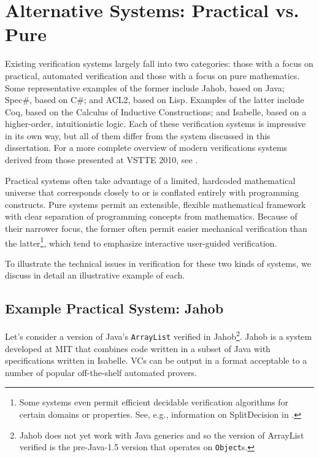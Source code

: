 \section{Alternative Systems: Practical vs. Pure}
Existing verification systems largely fall into two categories: those with a focus on practical, automated verification and those with a focus on pure mathematics.  Some representative examples of the former include Jahob\cite{kuncakJahobOverview}, based on Java; Spec\#\cite{specsharp}, based on C\#; and ACL2\cite{kaufmannACL2}, based on Lisp.  Examples of the latter include Coq\cite{coq}, based on the Calculus of Inductive Constructions; and Isabelle\cite{nipkowIsabelle}, based on a higher-order, intuitionistic logic.  Each of these verification systems is impressive in its own way, but all of them differ from the system discussed in this dissertation.  For a more complete overview of modern verifications systems derived from those presented at VSTTE 2010, see \cite{klebanovVSTTEExperience}.

Practical systems often take advantage of a limited, hardcoded mathematical universe that corresponds closely to or is conflated entirely with programming constructs.  Pure systems permit an extensible, flexible mathematical framework with clear separation of programming concepts from mathematics.  Because of their narrower focus, the former often permit easier mechanical verification than the latter\footnote{Some systems even permit efficient decidable verification algorithms for certain domains or properties.  See, e.g., information on SplitDecision in \cite{Sit11}.}, which tend to emphasize interactive user-guided verification.

To illustrate the technical issues in verification for these two kinds of systems, we discuss in detail an illustrative example of each.

\subsection{Example Practical System: Jahob\label{sec:exPractical}}
Let's consider a version of Java's \texttt{ArrayList} verified in Jahob\footnote{Jahob does not yet work with Java generics and so the version of ArrayList verified is the pre-Java-1.5 version that operates on \texttt{Object}s.}.  Jahob is a system developed at MIT that combines code written in a subset of Java with specifications written in Isabelle.  VCs can be output in a format acceptable to a number of popular off-the-shelf automated provers.

